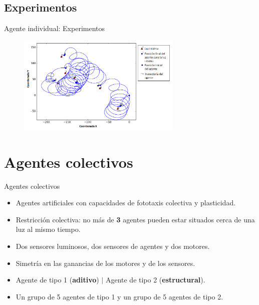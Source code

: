 \documentclass[aspectratio=169]{beamer}
\begin{document}
\subsection{Experimentos}
\begin{frame}{Agente individual: Experimentos}
  \begin{figure}
    \centering
  \includegraphics[width=0.7\textwidth,height=0.7\textheight]{Imagenes/Agente0Trayectoria}
\end{figure}
\end{frame}

\section{Agentes colectivos}
\begin{frame}{Agentes colectivos}
  \begin{itemize}
    \item Agentes artificiales con capacidades de fototaxis colectiva y plasticidad.
    \item Restricción colectiva: no más de \textbf{3} agentes pueden estar situados cerca de una luz al mismo tiempo.
    \item Dos sensores luminosos, dos sensores de agentes y dos motores.
    \item Simetría en las ganancias de los motores y de los sensores.
    \item Agente de tipo 1 (\textbf{aditivo}) $|$ Agente de tipo 2 (\textbf{estructural}).
    \item Un grupo de 5 agentes de tipo 1 y un grupo de 5 agentes de tipo 2.
  \end{itemize}
\end{frame}
\end{document}
